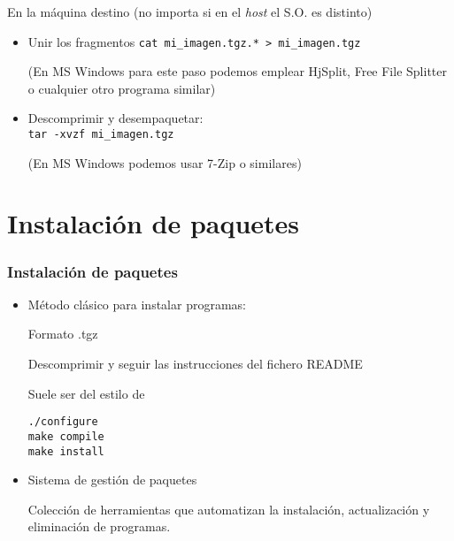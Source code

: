 \documentclass[ucs]{beamer}
\begin{document}
\begin{frame}[fragile]
En la máquina destino (no importa si en el \emph{host} el S.O. es distinto)
\begin{itemize}
\item
Unir los fragmentos
\verb|cat mi_imagen.tgz.* > mi_imagen.tgz|

(En MS Windows para este paso podemos emplear HjSplit, Free File Splitter o cualquier otro programa similar)
\item
Descomprimir y desempaquetar:\\ \verb|tar -xvzf mi_imagen.tgz |

(En MS Windows podemos usar 7-Zip  o similares)
\end{itemize}

\end{frame}


\section{Instalación de paquetes}
\begin{frame}[fragile]

\frametitle{Instalación de paquetes}
\begin{itemize}	
\item
Método clásico para instalar programas:

Formato .tgz

Descomprimir y seguir las instrucciones del fichero README

Suele ser del estilo de
\begin{verbatim}
./configure
make compile
make install
\end{verbatim}
\item 
Sistema de gestión de paquetes

Colección de herramientas que automatizan
la instalación, actualización y eliminación de programas.
\end{itemize}


\end{frame}
\end{document}
